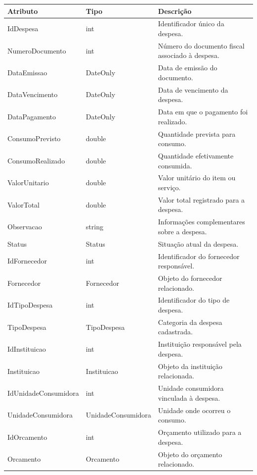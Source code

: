 \begin{quadro}[H]
\caption[Dicionário de dados da entidade Despesa]{Dicionário de dados da entidade Despesa}
\label{quad:dicionario-de-dados-da-entidade-despesa}

\begin{tabular}{|p{}|p{}|p{}|}
\hline
\textbf{Atributo} & \textbf{Tipo} & \textbf{Descrição} \\ 
\hline
IdDespesa & int & Identificador único da despesa. \\ 
\hline
NumeroDocumento & int & Número do documento fiscal associado à despesa. \\ 
\hline
DataEmissao & DateOnly & Data de emissão do documento. \\ 
\hline
DataVencimento & DateOnly & Data de vencimento da despesa. \\ 
\hline
DataPagamento & DateOnly & Data em que o pagamento foi realizado. \\ 
\hline
ConsumoPrevisto & double & Quantidade prevista para consumo. \\ 
\hline
ConsumoRealizado & double & Quantidade efetivamente consumida. \\ 
\hline
ValorUnitario & double & Valor unitário do item ou serviço. \\ 
\hline
ValorTotal & double & Valor total registrado para a despesa. \\ 
\hline
Observacao & string & Informações complementares sobre a despesa. \\ 
\hline
Status & Status & Situação atual da despesa. \\ 
\hline
IdFornecedor & int & Identificador do fornecedor responsável. \\ 
\hline
Fornecedor & Fornecedor & Objeto do fornecedor relacionado. \\ 
\hline
IdTipoDespesa & int & Identificador do tipo de despesa. \\ 
\hline
TipoDespesa & TipoDespesa & Categoria da despesa cadastrada. \\ 
\hline
IdInstituicao & int & Instituição responsável pela despesa. \\ 
\hline
Instituicao & Instituicao & Objeto da instituição relacionada. \\ 
\hline
IdUnidadeConsumidora & int & Unidade consumidora vinculada à despesa. \\ 
\hline
UnidadeConsumidora & UnidadeConsumidora & Unidade onde ocorreu o consumo. \\ 
\hline
IdOrcamento & int & Orçamento utilizado para a despesa. \\ 
\hline
Orcamento & Orcamento & Objeto do orçamento relacionado. \\ 
\hline
\end{tabular}


\end{quadro}



